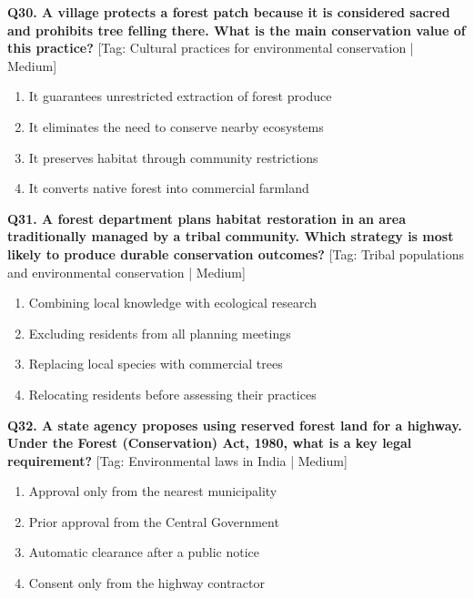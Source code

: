 \noindent\textbf{Q30. A village protects a forest patch because it is considered sacred and prohibits tree felling there. What is the main conservation value of this practice?} \hfill [Tag: Cultural practices for environmental conservation | Medium]
\begin{enumerate}[label=(\alph*),topsep=2pt,itemsep=1pt,partopsep=0pt,parsep=0pt]
    \item {It guarantees unrestricted extraction of forest produce}
    \item {It eliminates the need to conserve nearby ecosystems}
    \item {It preserves habitat through community restrictions}
    \item {It converts native forest into commercial farmland}
\end{enumerate}
\vspace{2mm}

\noindent\textbf{Q31. A forest department plans habitat restoration in an area traditionally managed by a tribal community. Which strategy is most likely to produce durable conservation outcomes?} \hfill [Tag: Tribal populations and environmental conservation | Medium]
\begin{enumerate}[label=(\alph*),topsep=2pt,itemsep=1pt,partopsep=0pt,parsep=0pt]
    \item {Combining local knowledge with ecological research}
    \item {Excluding residents from all planning meetings}
    \item {Replacing local species with commercial trees}
    \item {Relocating residents before assessing their practices}
\end{enumerate}
\vspace{2mm}

\noindent\textbf{Q32. A state agency proposes using reserved forest land for a highway. Under the Forest (Conservation) Act, 1980, what is a key legal requirement?} \hfill [Tag: Environmental laws in India | Medium]
\begin{enumerate}[label=(\alph*),topsep=2pt,itemsep=1pt,partopsep=0pt,parsep=0pt]
    \item {Approval only from the nearest municipality}
    \item {Prior approval from the Central Government}
    \item {Automatic clearance after a public notice}
    \item {Consent only from the highway contractor}
\end{enumerate}
\vspace{2mm}


